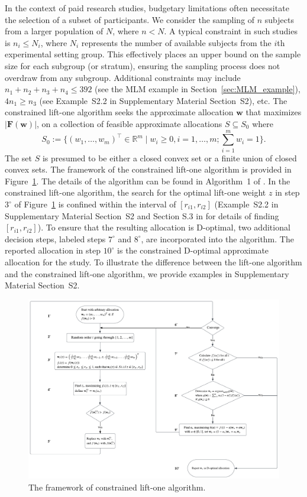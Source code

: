 In the context of paid research studies, budgetary limitations often necessitate the selection of a subset of participants. We consider the sampling of $n$ subjects from a larger population of $N$, where $n < N$. A typical constraint in such studies is $n_i \leq N_i$, where $N_i$ represents the number of available subjects from the $i$th experimental setting group. This effectively places an upper bound on the sample size for each subgroup (or stratum), ensuring the sampling process does not overdraw from any subgroup. Additional constraints may include $n_1 + n_2 + n_3 + n_4 \leq 392$ (see the MLM example in Section~\ref{sec:MLM_example}), $4n_1 \geq n_3$ (see Example~S2.2 in Supplementary Material Section~S2), etc. The constrained lift-one algorithm seeks the approximate allocation ${\mathbf w}$ that maximizes $|{\mathbf F}({\mathbf w})|$, on a collection of feasible approximate allocations $S \subseteq S_0$ where $$S_0 := \{(w_1, \ldots, w_m)^\top \in \mathbb{R}^m \mid w_i \geq 0, i=1, \ldots, m; \sum_{i=1}^m w_i = 1\}.$$ The set $S$ is presumed to be either a closed convex set or a finite union of closed convex sets.  The framework of the constrained lift-one algorithm is provided in Figure~\ref{fig:constrained_liftone_algo}. The details of the algorithm can be found in Algorithm~1 of \citet{huang2023constrained}. In the constrained lift-one algorithm, the search for the optimal lift-one weight $z$ in step $3^\circ$ of Figure~\ref{fig:constrained_liftone_algo} is confined within the interval of $[r_{i1}, r_{i2}]$ (Example~S2.2 in Supplementary Material Section~S2 and Section S.3 in \cite{huang2023constrained} for details of finding $[r_{i1}, r_{i2}]$).   To ensure that the resulting allocation is D-optimal, two additional decision steps, labeled steps $7^\circ$ and $8^\circ$, are incorporated into the algorithm. The reported allocation in step $10^\circ$ is the constrained D-optimal approximate allocation for the study. To illustrate the difference between the lift-one algorithm and the constrained lift-one algorithm, we provide examples in Supplementary Material Section~S2.

\begin{figure}[htb!]
    \centering
    \includegraphics[width=\textwidth]{figures/Lift_one.png}
    \caption{The framework of constrained lift-one algorithm.}
    \label{fig:constrained_liftone_algo}
\end{figure}

